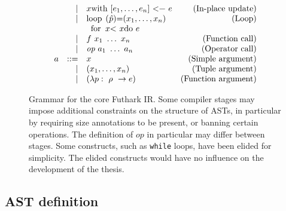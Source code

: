 \begin{figure*}
$$\begin{array}{lrlr}
      & | & \mbox{\lstinline[mathescape]!$x$ with [$e_{1},\ldots,e_{n}$] <-\ $e$!} &\mbox{(In-place update)}\\
      & | & \mbox{\lstinline[mathescape]!loop ($\hat{p}$)=($x_{1},\ldots,x_{n}$)!}  &  \mbox{(Loop)} \\
      &   & \mbox{\lstinline[mathescape]!\ for\ $x$ <\ $x$ do\ $e$!}\\
      & | & f~x_{1}~\ldots~x_{n} & \mbox{(Function call)}\\
      & | & \emph{op}~a_{1}~\ldots~a_{n} & \mbox{(Operator call)} \\
    a & ::= & x & \mbox{(Simple argument)} \\
      & |   & (x_{1}, \ldots, x_{n}) & \mbox{(Tuple argument)} \\
      & |   & (\Fn{\tty}{p}{e}) & \mbox{(Function argument)}
  \end{array}
  $$

  \caption{Grammar for the core Futhark IR.  Some compiler stages may
    impose additional constraints on the structure of ASTs, in
    particular by requiring size annotations to be present, or banning
    certain operations.  The definition of $op$ in particular may
    differ between stages.  Some constructs, such as \lstinline{while}
    loops, have been elided for simplicity.  The elided constructs
    would have no influence on the development of the thesis.}
  \label{fig:futhark-ir}
\end{figure*}

\subsection{AST definition}

